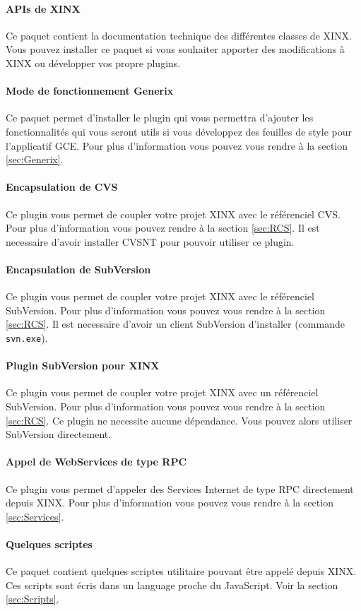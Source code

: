 \documentclass[a4paper,10pt,twoside]{book}
\begin{document}
\paragraph{APIs de XINX} Ce paquet contient la documentation technique des différentes classes de XINX. Vous pouvez installer ce paquet si vous souhaiter apporter des modifications à XINX ou développer vos propre plugins.
\paragraph{Mode de fonctionnement Generix} Ce paquet permet d'installer le plugin qui vous permettra d'ajouter les fonctionnalités qui vous seront utils si vous développez des feuilles de style pour l'applicatif GCE. Pour plus d'information vous pouvez vous rendre à la section \ref{sec:Generix}.
\paragraph{Encapsulation de CVS} Ce plugin vous permet de coupler votre projet XINX avec le référenciel CVS. Pour plus d'information vous pouvez rendre à la section \ref{sec:RCS}. Il est necessaire d'avoir installer CVSNT pour pouvoir utiliser ce plugin.
\paragraph{Encapsulation de SubVersion} Ce plugin vous permet de coupler votre projet XINX avec le référenciel SubVersion. Pour plus d'information vous pouvez vous rendre à la section \ref{sec:RCS}. Il est necessaire d'avoir un client SubVersion d'installer (commande \verb+svn.exe+).
\paragraph{Plugin SubVersion pour XINX} Ce plugin vous permet de coupler votre projet XINX avec un référenciel SubVersion. Pour plus d'information vous pouvez vous rendre à la section \ref{sec:RCS}. Ce plugin ne necessite aucune dépendance. Vous pouvez alors utiliser SubVersion directement.
\paragraph{Appel de WebServices de type RPC} Ce plugin vous permet d'appeler des Services Internet de type RPC directement depuis XINX. Pour plus d'information vous pouvez vous rendre à la section \ref{sec:Services}.
\paragraph{Quelques scriptes} Ce paquet contient quelques scriptes utilitaire pouvant être appelé depuis XINX. Ces scripts sont écris dans un language proche du JavaScript. Voir la section \ref{sec:Scripts}.
\end{document}
